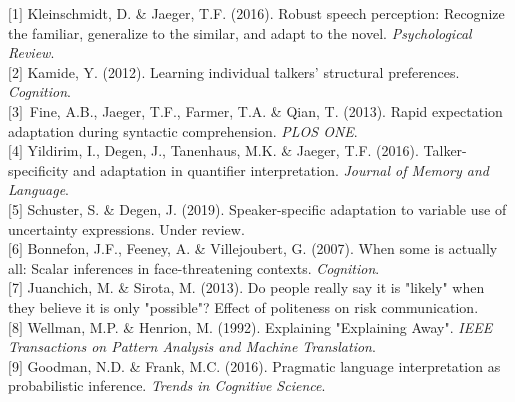 \documentclass[11pt]{article}
\begin{document}
\noindent $[$1$]$ Kleinschmidt, D. \& Jaeger, T.F. (2016). Robust speech perception: Recognize the familiar, generalize to the similar, and adapt to the novel. \textit{Psychological Review}.
\\ $[$2$]$ Kamide, Y. (2012). Learning individual talkers' structural preferences. \textit{Cognition}.
\\$[$3$]$~Fine, A.B., Jaeger, T.F., Farmer, T.A. \& Qian, T. (2013). Rapid expectation adaptation during syntactic comprehension. \textit{PLOS ONE}.
\\$[$4$]$ Yildirim, I., Degen, J., Tanenhaus, M.K. \& Jaeger, T.F. (2016). Talker-specificity and adaptation in quantifier interpretation. \textit{Journal of Memory and Language}.
\\$[$5$]$  Schuster, S. \& Degen, J. (2019). Speaker-specific adaptation to variable use of uncertainty expressions. Under review.
\\$[$6$]$   Bonnefon, J.F., Feeney, A. \& Villejoubert, G. (2007). When some is actually all: Scalar inferences in face-threatening contexts. \textit{Cognition}.
\\$[$7$]$  Juanchich, M. \& Sirota, M. (2013). Do people really say it is "likely" when they believe it is only "possible"? Effect of politeness on risk communication.
\\$[$8$]$  Wellman, M.P. \& Henrion, M. (1992). Explaining "Explaining Away". \textit{IEEE Transactions on Pattern Analysis and Machine Translation}.
\\$[$9$]$ Goodman, N.D. \& Frank, M.C. (2016). Pragmatic language interpretation as probabilistic inference. \textit{Trends in Cognitive Science}.
\end{document}
